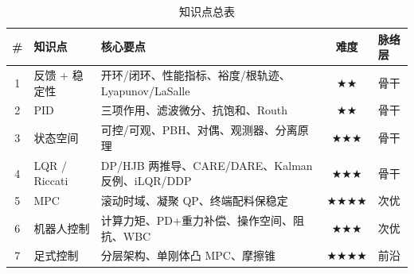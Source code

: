 \begin{table}[H]\centering\small
\caption{知识点总表}
\label{tab:ctrl-points}
\begin{tabular}{cllcl}
\toprule
\# & 知识点 & 核心要点 & 难度 & 脉络层 \\
\midrule
1 & 反馈 + 稳定性 & 开环/闭环、性能指标、裕度/根轨迹、Lyapunov/LaSalle & \(\bigstar\bigstar\) & 骨干 \\
2 & PID & 三项作用、滤波微分、抗饱和、Routh & \(\bigstar\bigstar\) & 骨干 \\
3 & 状态空间 & 可控/可观、PBH、对偶、观测器、分离原理 & \(\bigstar\bigstar\bigstar\) & 骨干 \\
4 & LQR / Riccati & DP/HJB 两推导、CARE/DARE、Kalman 反例、iLQR/DDP & \(\bigstar\bigstar\bigstar\) & 骨干 \\
5 & MPC & 滚动时域、凝聚 QP、终端配料保稳定 & \(\bigstar\bigstar\bigstar\bigstar\) & 次优 \\
6 & 机器人控制 & 计算力矩、PD+重力补偿、操作空间、阻抗、WBC & \(\bigstar\bigstar\bigstar\) & 次优 \\
7 & 足式控制 & 分层架构、单刚体凸 MPC、摩擦锥 & \(\bigstar\bigstar\bigstar\bigstar\) & 前沿 \\
\bottomrule
\end{tabular}
\end{table}

